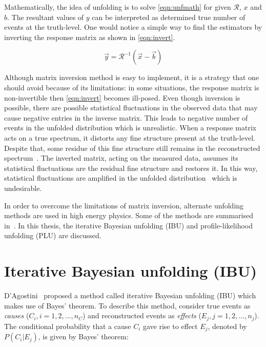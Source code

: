 Mathematically, the idea of unfolding is to solve \cref{eqn:unfmath} for given 
$\mathcal{R}$, $x$ and $b$. The resultant values of $y$ can be interpreted as 
determined true number of events at the truth-level. One would notice a simple way to 
find the estimators by inverting the response matrix as shown in \cref{eqn:invert}.

\begin{equation}
    \vec{y} = \mathcal{R}^{-1} (\vec{x}-\vec{b})
    \label{eqn:invert}
\end{equation}

Although matrix inversion method is easy to implement, it is a strategy that one should 
avoid because of its limitations: in some situations, the response matrix is non-invertible
then \cref{eqn:invert} becomes ill-posed. Even though inversion is possible, there are possible
statistical fluctuations in the observed data that may cause negative entries in the 
inverse matrix. This leads to negative number of events in the unfolded distribution
which is unrealistic. When a response matrix acts on a true spectrum, it distorts any 
fine structure present at the truth-level. Despite that, some residue of this fine 
structure still remains in the reconstructed spectrum~\cite{cowan}. The inverted matrix, 
acting on the measured data, assumes its statistical fluctuations are the residual fine 
structure and restores it. In this way, statistical fluctuations are amplified in the unfolded
distribution~\cite{inverse} which is undesirable.

In order to overcome the limitations of matrix inversion, alternate unfolding methods are used
in high energy physics. Some of the methods are summarised in~\cite{refId0}.
In this thesis, the iterative Bayesian unfolding (IBU) and profile-likelihood unfolding (PLU)
are discussed.



\section{Iterative Bayesian unfolding (IBU)}

D'Agostini~\cite{DAGOSTINI1995487} proposed a method called iterative Bayesian unfolding (IBU) 
which makes use of Bayes' theorem. To describe this method, consider true events as 
\textit{causes} ($C_i, i=1,2,...,n_C$) and reconstructed events as 
\textit{effects} ($E_j, j=1,2,...,n_j$). The conditional probability that a cause $C_i$ gave 
rise to effect $E_j$, denoted by $P(C_i|E_j)$, is given by Bayes' theorem:

